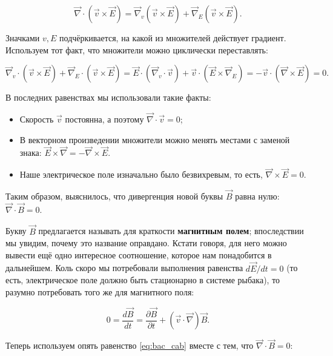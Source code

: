 \documentclass[a4paper,12pt]{article}
\newcommand{\pt}{\partial}
\newcommand{\vn}{\vec{\nabla}}
\begin{document}
\begin{equation}
  \label{eq:nabla_eq_1}
  \vn \cdot \left( \vec{v} \times \vec{E} \right) = \vn_v \left(
    \vec{v} \times \vec{E} \right)  + \vn_E \left( \vec{v} \times \vec{E} \right).
\end{equation}

Значками $v,E$ подчёркивается, на какой из множителей действует
градиент. Используем тот факт, что множители можно циклически
переставлять: 

\begin{equation}
  \label{eq:nabla_eq_2}
  \vn_v \cdot \left(
    \vec{v} \times \vec{E} \right)  + \vn_E \cdot \left( \vec{v} \times
    \vec{E} \right) = \vec{E} \cdot \left( \vn_v \cdot \vec{v} \right) +
  \vec{v} \cdot \left( \vec{E} \times \vn_E \right) = -\vec{v} \cdot
  \left( \vn \times \vec{E} \right) =0.
\end{equation}

В последних равенствах мы использовали такие факты: 

\begin{itemize}
\item Скорость $\vec{v}$ постоянна, а поэтому $\vn \cdot \vec{v} =0$;
\item В векторном произведении множители можно менять местами с
  заменой знака: $\vec{E} \times \vn = - \vn \times \vec{E}$.
\item Наше электрическое поле изначально было безвихревым, то есть,
  $\vn \times \vec{E}=0$.
\end{itemize}

Таким образом, выяснилось, что дивергенция новой буквы $\vec{B}$ равна
нулю: $\vn \cdot \vec{B}=0$.

Букву $\vec{B}$ предлагается называть для краткости \textbf{магнитным
  полем}; впоследствии мы увидим, почему это название
оправдано. Кстати говоря, для него можно вывести ещё одно интересное
соотношение, которое нам понадобится в дальнейшем. Коль скоро мы
потребовали выполнения равенства $d\vec{E}/dt=0$ (то есть, электрическое
поле должно быть стационарно в системе рыбака), то разумно потребовать
того же для магнитного поля:

\begin{equation}
  \label{eq:db/dt_1}
  0=\frac{d\vec{B}}{dt} = \frac{\pt \vec{B}}{\pt t} + \left( \vec{v}
    \cdot \vn \right) \vec{B}.
\end{equation}

Теперь используем опять равенство \eqref{eq:bac_cab} вместе с тем, что
$\vn \cdot \vec{B}=0$: 
\end{document}
